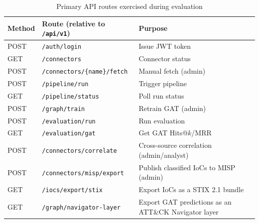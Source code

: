 \documentclass[conference]{IEEEtran}
\begin{document}
\begin{table}[h]
\caption{Primary API routes exercised during evaluation}
\label{tab:api}
\centering
\footnotesize
\begin{tabular}{@{}p{1.0cm}p{4.0cm}p{2.2cm}@{}}
\toprule
\textbf{Method} & \textbf{Route (relative to \texttt{/api/v1})} & \textbf{Purpose} \\
\midrule
POST & \texttt{/auth/login} & Issue JWT token \\
GET & \texttt{/connectors} & Connector status \\
POST & \texttt{/connectors/\{name\}/\allowbreak fetch} & Manual fetch (admin) \\
POST & \texttt{/pipeline/run} & Trigger pipeline \\
GET & \texttt{/pipeline/status} & Poll run status \\
POST & \texttt{/graph/train} & Retrain GAT (admin) \\
POST & \texttt{/evaluation/run} & Run evaluation \\
GET & \texttt{/evaluation/gat} & Get GAT Hits@$k$/MRR \\
\midrule
POST & \texttt{/connectors/\allowbreak correlate} & Cross-source correlation (admin/analyst) \\
POST & \texttt{/connectors/\allowbreak misp/export} & Publish classified IoCs to MISP (admin) \\
GET & \texttt{/iocs/\allowbreak export/stix} & Export IoCs as a STIX 2.1 bundle \\
GET & \texttt{/graph/\allowbreak navigator-layer} & Export GAT predictions as an ATT\&CK Navigator layer \\
\bottomrule
\end{tabular}
\end{table}
\end{document}
